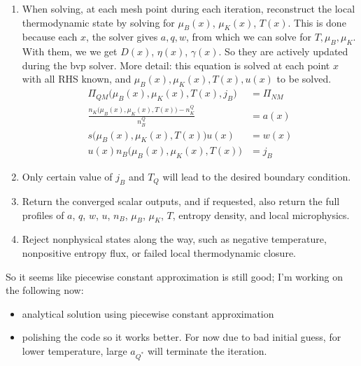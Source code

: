 \documentclass[11pt]{article}
\begin{document}
\begin{enumerate}
\begin{itemize}
    \item The last boundary condition is satisfied by a $e^{-\lambda x}$ asymptotic tail, so imposing that forces the solver to pick the right asymptotic behavior. 
    \item Also, we apply rescaling of $x$ to $y = 1-e^{-\lambda x}$, which maps $(0,+\infty)$ to $(0,1)$, then we impose a cut-off $y\in(0,y_{end})$ where $y_{end} = 1-\epsilon$ with $\epsilon\sim 10^{-6}$.
\end{itemize}
\item When solving, at each mesh point during each iteration, reconstruct the local thermodynamic state by solving for $\mu_B(x)$, $\mu_K(x)$, $T(x)$. This is done because each $x$, the solver gives $a,q,w$, from which we can solve for $T, \mu_B, \mu_K$. With them, we we get $D(x)$, $\eta(x)$, $\gamma(x)$. So they are actively updated during the bvp solver. More detail: this equation is solved at each point $x$ with all RHS known, and $\mu_B(x), \mu_K(x), T(x), u(x)$ to be solved. 
\begin{align}
\Pi_{QM}\Big(\mu_B(x), \mu_K(x), T(x), j_B\Big) & = \Pi_{NM} \\
\frac{n_K\Big(\mu_B(x), \mu_K(x), T(x)\Big) - n_K^Q}{n_B^Q} & =  a(x) \\
s\Big(\mu_B(x), \mu_K(x), T(x)\Big)u(x) & = w(x) \\
u(x)n_B\Big(\mu_B(x), \mu_K(x), T(x)\Big) & = j_B
\end{align}
\item Only certain value of $j_B$ and $T_Q$ will lead to the desired boundary condition.
\item Return the converged scalar outputs, and if requested, also return the full profiles of $a$, $q$, $w$, $u$, $n_B$, $\mu_B$, $\mu_K$, $T$, entropy density, and local microphysics.
\item Reject nonphysical states along the way, such as negative temperature, nonpositive entropy flux, or failed local thermodynamic closure.
\end{enumerate}
\fi

So it seems like piecewise constant approximation is still good; I'm working on the following now:
\begin{itemize}  
    \item analytical solution using piecewise constant approximation
    \item polishing the code so it works better. For now due to bad initial guess, for lower temperature, large $a_{Q^*}$ will terminate the iteration.
\end{itemize}
\end{document}
